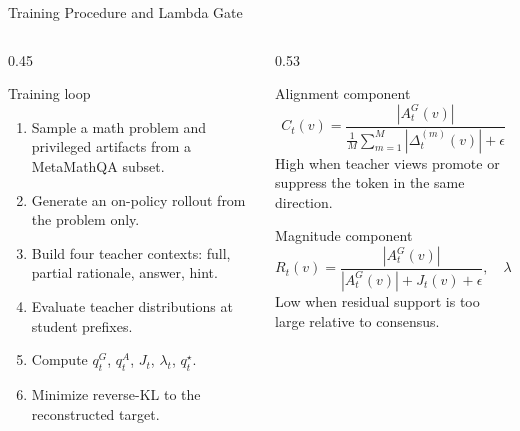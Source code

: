 \documentclass[aspectratio=169]{beamer}
\newcommand{\tightitems}{
  \setlength{\itemsep}{0.25em}
  \setlength{\parskip}{0pt}
}
\begin{document}
\begin{frame}{Training Procedure and Lambda Gate}
  \footnotesize
  \begin{columns}[T,onlytextwidth]
    \begin{column}{0.45\textwidth}
      \begin{block}{Training loop}
        \begin{enumerate}\tightitems
          \item Sample a math problem and privileged artifacts from a MetaMathQA subset.
          \item Generate an on-policy rollout from the problem only.
          \item Build four teacher contexts: full, partial rationale, answer, hint.
          \item Evaluate teacher distributions at student prefixes.
          \item Compute $q_t^G$, $q_t^A$, $J_t$, $\lambda_t$, $q_t^\star$.
          \item Minimize reverse-KL to the reconstructed target.
        \end{enumerate}
      \end{block}
    \end{column}
    \begin{column}{0.53\textwidth}
      \begin{block}{Alignment component}
        \[
          C_t(v)=
          \frac{|A_t^G(v)|}
          {\frac{1}{M}\sum_{m=1}^{M}|\Delta_t^{(m)}(v)|+\epsilon}
        \]
        High when teacher views promote or suppress the token in the same direction.
      \end{block}
      \begin{block}{Magnitude component}
        \[
          R_t(v)=\frac{|A_t^G(v)|}{|A_t^G(v)|+J_t(v)+\epsilon},
          \quad
          \lambda_t(v)=C_t(v)R_t(v)
        \]
        Low when residual support is too large relative to consensus.
      \end{block}
    \end{column}
  \end{columns}
\end{frame}
\end{document}
